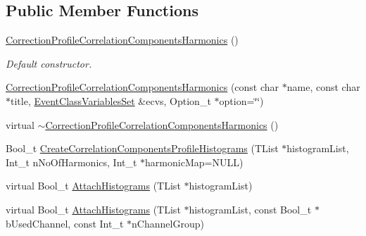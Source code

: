 \subsection*{Public Member Functions}
\begin{DoxyCompactItemize}
\item 
\mbox{\label{classQn_1_1CorrectionProfileCorrelationComponentsHarmonics_a4fbf93f74a23339984288928e4a916dc}} 
\mbox{\hyperlink{classQn_1_1CorrectionProfileCorrelationComponentsHarmonics_a4fbf93f74a23339984288928e4a916dc}{Correction\+Profile\+Correlation\+Components\+Harmonics}} ()
\begin{DoxyCompactList}\small\item\em Default constructor. \end{DoxyCompactList}\item 
\mbox{\hyperlink{classQn_1_1CorrectionProfileCorrelationComponentsHarmonics_a87efcaa6fb3a2e3bf1296bafc977aa3d}{Correction\+Profile\+Correlation\+Components\+Harmonics}} (const char $\ast$name, const char $\ast$title, \mbox{\hyperlink{classQn_1_1EventClassVariablesSet}{Event\+Class\+Variables\+Set}} \&ecvs, Option\+\_\+t $\ast$option=\char`\"{}\char`\"{})
\item 
virtual \mbox{\hyperlink{classQn_1_1CorrectionProfileCorrelationComponentsHarmonics_a68cad43115b31ed195d3553a7fa1dd52}{$\sim$\+Correction\+Profile\+Correlation\+Components\+Harmonics}} ()
\item 
Bool\+\_\+t \mbox{\hyperlink{classQn_1_1CorrectionProfileCorrelationComponentsHarmonics_a397aabf8866ef1056d04198a55a9d660}{Create\+Correlation\+Components\+Profile\+Histograms}} (T\+List $\ast$histogram\+List, Int\+\_\+t n\+No\+Of\+Harmonics, Int\+\_\+t $\ast$harmonic\+Map=N\+U\+LL)
\item 
virtual Bool\+\_\+t \mbox{\hyperlink{classQn_1_1CorrectionProfileCorrelationComponentsHarmonics_ab338a5263d8eb124c3a6a0bbde5f72e3}{Attach\+Histograms}} (T\+List $\ast$histogram\+List)
\item 
\mbox{\label{classQn_1_1CorrectionProfileCorrelationComponentsHarmonics_a2e4534d5d49ec13573619dd48735b044}} 
virtual Bool\+\_\+t \mbox{\hyperlink{classQn_1_1CorrectionProfileCorrelationComponentsHarmonics_a2e4534d5d49ec13573619dd48735b044}{Attach\+Histograms}} (T\+List $\ast$histogram\+List, const Bool\+\_\+t $\ast$b\+Used\+Channel, const Int\+\_\+t $\ast$n\+Channel\+Group)

\end{DoxyCompactItemize}
